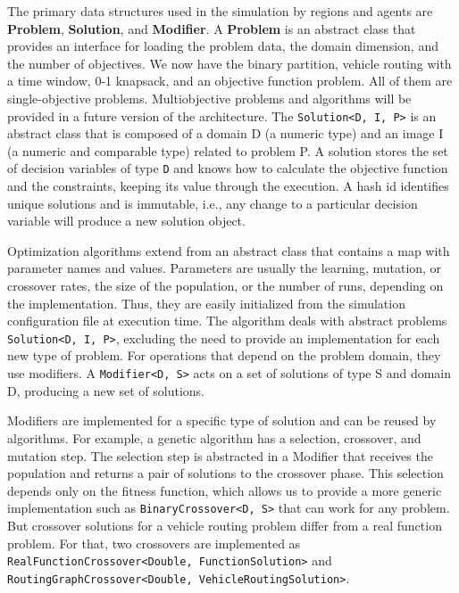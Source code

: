\documentclass[preprint,12pt]{elsarticle}
\begin{document}
The primary data structures used in the simulation by regions and agents are \textbf{Problem}, \textbf{Solution}, and \textbf{Modifier}. A \textbf{Problem} is an abstract class that provides an interface for loading the problem data, the domain dimension, and the number of objectives. We now have the binary partition, vehicle routing with a time window, 0-1 knapsack, and an objective function problem. All of them are single-objective problems. Multiobjective problems and algorithms will be provided in a future version of the architecture. The \texttt{Solution<D, I, P>} is an abstract class that is composed of a domain D (a numeric type) and an image I (a numeric and comparable type) related to problem P. A solution stores the set of decision variables of type \texttt{D} and knows how to calculate the objective function and the constraints, keeping its value through the execution. A hash id identifies unique solutions and is immutable, i.e., any change to a particular decision variable will produce a new solution object.  

Optimization algorithms extend from an abstract class that contains a map with parameter names and values. Parameters are usually the learning, mutation, or crossover rates, the size of the population, or the number of runs, depending on the implementation. Thus, they are easily initialized from the simulation configuration file at execution time. 
The algorithm deals with abstract problems \texttt{Solution<D, I, P>}, excluding the need to provide an implementation for each new type of problem. For operations that depend on the problem domain, they use modifiers. A \texttt{Modifier<D, S>} acts on a set of solutions of type S and domain D, producing a new set of solutions. 

Modifiers are implemented for a specific type of solution and can be reused by algorithms. For example, a genetic algorithm has a selection, crossover, and mutation step. The selection step is abstracted in a Modifier that receives the population and returns a pair of solutions to the crossover phase. This selection depends only on the fitness function, which allows us to provide a more generic implementation such as \texttt{BinaryCrossover<D, S>} that can work for any problem. But crossover solutions for a vehicle routing problem differ from a real function problem.  For that, two crossovers are implemented as \texttt{RealFunctionCrossover<Double, FunctionSolution>} and \texttt{RoutingGraphCrossover<Double, VehicleRoutingSolution>}.
\end{document}
